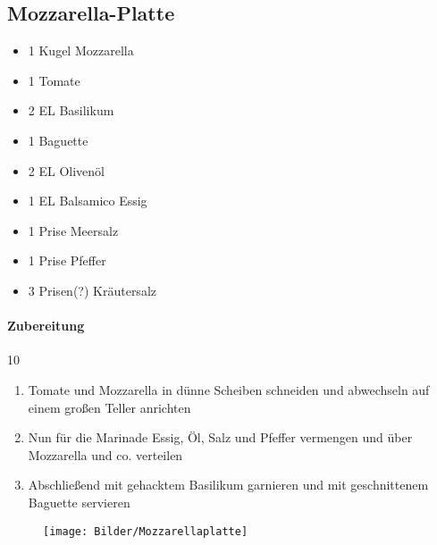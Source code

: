 \subsection{Mozzarella-Platte}
\begin{itemize}[noitemsep]
	\item 1 Kugel Mozzarella 
	\item 1 Tomate 
	\item 2 EL Basilikum
	\item 1 Baguette
	\vspace{0.5cm}
	\item 2 EL Olivenöl
	\item 1 EL Balsamico Essig 
	\item 1 Prise Meersalz
	\item 1 Prise Pfeffer
	\item 3 Prisen(?) Kräutersalz	
\end{itemize}
\paragraph{Zubereitung}10
\begin{enumerate}[noitemsep]
	\item Tomate und Mozzarella in dünne Scheiben schneiden und abwechseln auf einem großen Teller anrichten
	\item Nun für die Marinade Essig, Öl, Salz und Pfeffer vermengen und über Mozzarella und co. verteilen
	\item Abschließend mit gehacktem Basilikum garnieren und mit geschnittenem Baguette servieren
\end{enumerate}
\begin{figure}[h]
\centering
\texttt{[image: Bilder/Mozzarellaplatte]}
\end{figure}